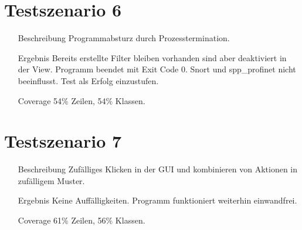 \section{Testszenario 6}

\begin{enumerate}[leftmargin = *, align=parleft, labelsep=3cm]
  \item[Beschreibung] Programmabsturz durch Prozesstermination.
  \item[Ergebnis] Bereits erstellte Filter bleiben vorhanden sind aber deaktiviert in der View. Programm beendet mit Exit Code 0. Snort und spp\_profinet nicht beeinflusst. Test als Erfolg einzustufen.
  \item[Coverage] 54\% Zeilen, 54\% Klassen.
\end{enumerate} 

\section{Testszenario 7}

\begin{enumerate}
  \item[Beschreibung] Zufälliges Klicken in der GUI und kombinieren von Aktionen in zufälligem Muster.
  \item[Ergebnis] Keine Auffälligkeiten. Programm funktioniert weiterhin einwandfrei.
  \item[Coverage] 61\% Zeilen, 56\% Klassen.
\end{enumerate}